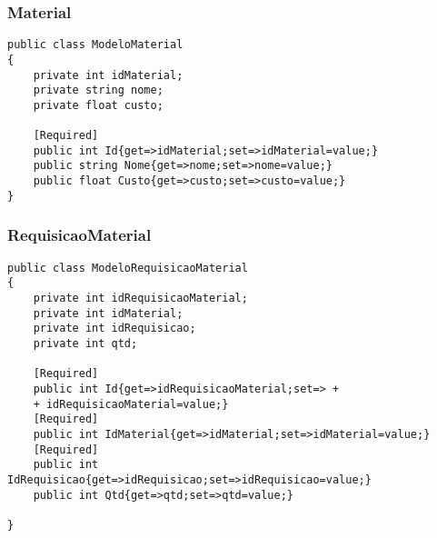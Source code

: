 \subsubsection{Material}
\begin{lstlisting}
public class ModeloMaterial
{
    private int idMaterial;
    private string nome;
    private float custo;

    [Required]
    public int Id{get=>idMaterial;set=>idMaterial=value;}
    public string Nome{get=>nome;set=>nome=value;}
    public float Custo{get=>custo;set=>custo=value;}
}
\end{lstlisting}

\subsubsection{RequisicaoMaterial}
\begin{lstlisting}
public class ModeloRequisicaoMaterial
{
    private int idRequisicaoMaterial;
    private int idMaterial;
    private int idRequisicao;
    private int qtd;

    [Required]
    public int Id{get=>idRequisicaoMaterial;set=> +
    + idRequisicaoMaterial=value;}
    [Required]
    public int IdMaterial{get=>idMaterial;set=>idMaterial=value;}
    [Required]
    public int IdRequisicao{get=>idRequisicao;set=>idRequisicao=value;}
    public int Qtd{get=>qtd;set=>qtd=value;}
    
}
\end{lstlisting}


